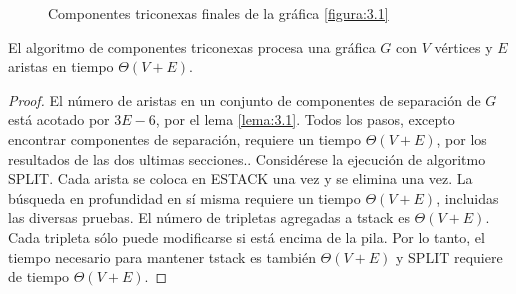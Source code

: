 \begin{figure}[H]
\begin{center}
\begin{subfigure}[b]{0.8\textwidth}
        \end{subfigure}
        \end{center}
     \caption{Componentes triconexas finales de la gráfica \ref{figura:3.1}}
    \label{figura:3.6}
\end{figure}

\begin{lemma}
El algoritmo de componentes triconexas procesa una gráfica $G$ con $V$ vértices y $E$ aristas en tiempo $\Theta \left(V + E\right)$.
\label{lema:3.15}
\end{lemma}

\begin{proof}
El número de aristas en un conjunto de componentes de separación de $G$ está acotado por $3E - 6$, por el lema \ref{lema:3.1}. Todos los pasos, excepto encontrar componentes de separación, requiere un tiempo $\Theta\left(V+ E\right)$, por los resultados de las dos ultimas secciones.. Considérese la ejecución de algoritmo SPLIT. Cada arista se coloca en ESTACK una vez y se elimina una vez. La búsqueda en profundidad en sí misma requiere un tiempo $\Theta\left(V + E\right)$, incluidas las diversas pruebas. El número de tripletas agregadas a tstack es $\Theta\left(V + E\right)$. Cada tripleta sólo puede modificarse si está encima de la pila. Por lo tanto, el tiempo necesario para mantener tstack es también $\Theta\left(V + E\right)$ y SPLIT requiere de tiempo $\Theta\left(V + E\right)$.
\end{proof}
